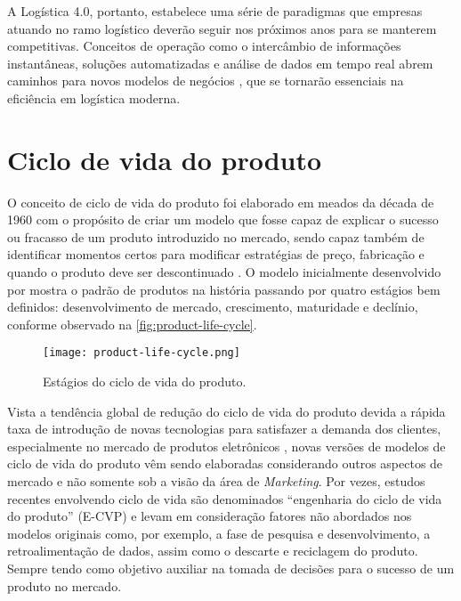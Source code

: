 	A Logística 4.0, portanto, estabelece uma série de paradigmas que empresas atuando no ramo logístico deverão seguir nos próximos anos para se manterem competitivas. Conceitos de operação como o intercâmbio de informações instantâneas, soluções automatizadas e análise de dados em tempo real abrem caminhos para novos modelos de negócios \cite{strandhagen2017logistics}, que se tornarão essenciais na eficiência em logística moderna.

	
\section{Ciclo de vida do produto}
	
	O conceito de ciclo de vida do produto foi elaborado em meados da década de 1960 com o propósito de criar um modelo que fosse capaz de explicar o sucesso ou fracasso de um produto introduzido no mercado, sendo capaz também de identificar momentos certos para modificar estratégias de preço, fabricação e quando o produto deve ser descontinuado \cite{cao2012lifecycle}. O modelo inicialmente desenvolvido por  mostra o padrão de produtos na história passando por quatro estágios bem definidos: desenvolvimento de mercado, crescimento, maturidade e declínio, conforme observado na \autoref{fig:product-life-cycle}.
	
	\begin{figure}[htb]
		\centering
		\label{fig:product-life-cycle}
		\texttt{[image: product-life-cycle.png]}
		\caption{Estágios do ciclo de vida do produto.}
	\end{figure}
	
	Vista a tendência global de redução do ciclo de vida do produto devida a rápida taxa de introdução de novas tecnologias para satisfazer a demanda dos clientes, especialmente no mercado de produtos eletrônicos \cite{trappey2008lifecycle}, novas versões de modelos de ciclo de vida do produto vêm sendo elaboradas considerando outros aspectos de mercado e não somente sob a visão da área de \textit{Marketing}. Por vezes, estudos recentes envolvendo ciclo de vida são denominados ``engenharia do ciclo de vida do produto'' (E-CVP) \cite{cao2012lifecycle} e levam em consideração fatores não abordados nos modelos originais como, por exemplo, a fase de pesquisa e desenvolvimento, a retroalimentação de dados, assim como o descarte e reciclagem do produto. Sempre tendo como objetivo auxiliar na tomada de decisões para o sucesso de um produto no mercado.
	
